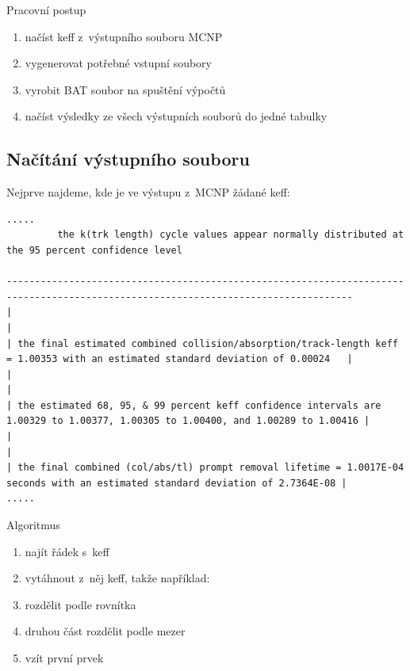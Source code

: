 \documentclass{beamer}
\begin{document}
\begin{frame}{Pracovní postup}
  \begin{enumerate}
    \item načíst keff z~výstupního souboru MCNP
    \pause
    \item vygenerovat potřebné vstupní soubory
    \pause
    \item vyrobit BAT soubor na spuštění výpočtů
    \pause
    \item načíst výsledky ze všech výstupních souborů do jedné tabulky
  \end{enumerate}
\end{frame}

\subsection{Načítání výstupního souboru}

\begin{frame}[fragile]{}
  Nejprve najdeme, kde je ve výstupu z~MCNP žádané keff:
  {\tiny
  \begin{verbatim}
.....
         the k(trk length) cycle values appear normally distributed at the 95 percent confidence level

-----------------------------------------------------------------------------------------------------------------------------------
|                                                                                                                                 |
| the final estimated combined collision/absorption/track-length keff = 1.00353 with an estimated standard deviation of 0.00024   |
|                                                                                                                                 |
| the estimated 68, 95, & 99 percent keff confidence intervals are 1.00329 to 1.00377, 1.00305 to 1.00400, and 1.00289 to 1.00416 |
|                                                                                                                                 |
| the final combined (col/abs/tl) prompt removal lifetime = 1.0017E-04 seconds with an estimated standard deviation of 2.7364E-08 |
.....
  \end{verbatim}
  }
\end{frame}

\begin{frame}{Algoritmus}
  \begin{enumerate}
    \item najít řádek s~keff
    \pause
    \item vytáhnout z~něj keff, takže například:
    \pause
    \item rozdělit podle rovnítka
    \pause
    \item druhou část rozdělit podle mezer
    \pause
    \item vzít první prvek
  \end{enumerate}
\end{frame}
\end{document}
